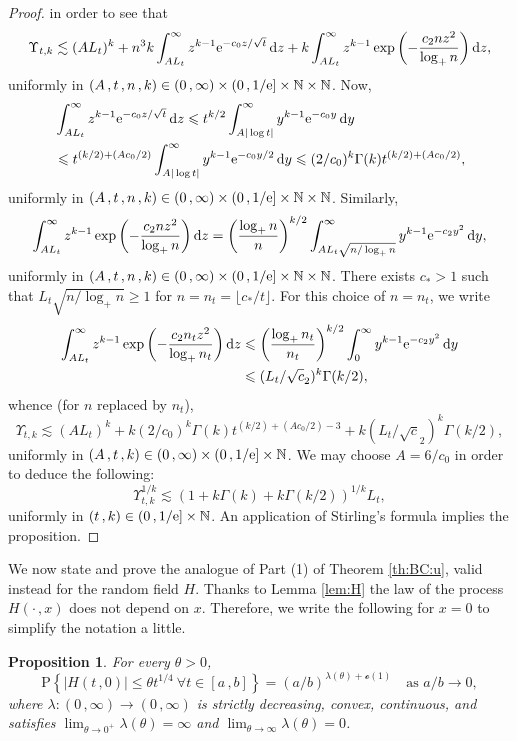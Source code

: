 \documentclass[reqno]{amsart}
\newcommand{\<}{\langle}
\renewcommand{\>}{\rangle}
\newcommand{\N}{\mathbb{N}}
\renewcommand{\P}{\mathrm{P}}
\newcommand{\1}{\mathbb{1}}
\renewcommand{\d}{{\rm d}}
\newcommand{\e}{{\rm e}}
\renewcommand{\ge}{\geqslant}
\renewcommand{\le}{\leqslant}
\newtheorem{proposition}[stat]{Proposition}
\theoremstyle{definition}
\numberwithin{equation}{section}
\begin{document}
\begin{proof}
	in order to see that
	\[
		\Upsilon_{t,k} \lesssim (AL_t)^k
		+  n^3k\int_{AL_t}^\infty z^{k-1}\e^{-c_0z/\sqrt{t}}\,\d z
		+ k\int_{AL_t}^\infty z^{k-1}
		\exp\left( - \frac{c_2nz^2}{\log_+ n}\right)\d z,
	\]
	uniformly in $(A\,,t\,,n\,,k)\in(0\,,\infty)\times(0\,,1/\e]\times\N\times\N$.
	Now,
	\begin{align*}
		&\int_{AL_t}^\infty z^{k-1}\e^{-c_0z/\sqrt{t}}\,\d z
			\le t^{k/2} \int_{A|\log t|}^\infty y^{k-1}\e^{-c_0y}\,\d y\\
		&\le t^{(k/2)+(Ac_0/2)} \int_{A|\log t|}^\infty y^{k-1}\e^{-c_0y/2}\,\d y
			\le (2/c_0)^k\Gamma(k)t^{(k/2)+(Ac_0/2)},
	\end{align*}
	uniformly in $(A\,,t\,,n\,,k)\in(0\,,\infty)\times
	(0\,,1/\e]\times\N\times\N$.
	Similarly,
	\[
		\int_{AL_t}^\infty z^{k-1}
		\exp\left( - \frac{c_2nz^2}{\log_+ n}\right)\d z
		= \left( \frac{\log_+ n}{n}\right)^{k/2}
		\int_{AL_t \sqrt{n/\log_+n}}^\infty y^{k-1} \e^{-c_2y^2}\,\d y,
	\]
	uniformly in $(A\,,t\,,n\,,k)\in(0\,,\infty)\times
	(0\,,1/\e]\times\N\times\N$. There exists $c_*>1$
	such that $L_t \sqrt{n/\log_+n} \ge 1$ for $n= n_t = \lfloor c_*/t\rfloor.$
	For this choice of $n=n_t$, we write
	\begin{align*}
		\int_{AL_t}^\infty z^{k-1}
			\exp\left( - \frac{c_2n_t z^2}{\log_+ n_t}\right)\d z
			&\le \left( \frac{\log_+ n_t}{n_t}\right)^{k/2}
			\int_0^\infty y^{k-1} \e^{-c_2y^2}\,\d y\\
		& \le (L_t/ \sqrt c_2)^{k}\Gamma(k/2),
	\end{align*}
	whence (for $n$ replaced by $n_t$),
	\[
		\Upsilon_{t,k} \lesssim (AL_t)^k
		+  k(2/c_0)^k\Gamma(k)t^{(k/2)+(Ac_0/2) -3}
		+ k(L_t/\sqrt c_2)^k\Gamma(k/2),
	\]
	uniformly in $(A\,,t\,,k)\in(0\,,\infty)\times
	(0\,,1/\e]\times\N$. We may choose
	$A=6/c_0$ in order to deduce the following:
	\[
		\Upsilon_{t,k}^{1/k}
		\lesssim \left( 1
		+  k\Gamma(k)
		+ k\Gamma(k/2)\right)^{1/k} L_t,
	\]
	uniformly in $(t\,,k)\in(0\,,1/\e]\times\N$. 
	An application of Stirling's formula
	implies the proposition.
\end{proof}

We now state and prove the analogue of Part (1) of
Theorem \ref{th:BC:u}, valid instead for the random
field $H$. Thanks to Lemma \ref{lem:H} the
law of the process $H(\cdot\,,x)$ does not depend on $x$.
Therefore, we write the following for $x=0$ to simplify the
notation a little.

\begin{proposition}\label{pr:BC:H}
	For every $\theta>0$,
	\[ 
		\P\left\{  | H(t\,,0)| \le \theta t^{1/4}\
		\forall t\in[a\,,b]\right\}
		= (a/b)^{\lambda(\theta)+\mathscr{o}(1)}\quad\text{as $a/b\to0$},
	\]
	where $\lambda:(0\,,\infty)\to(0\,,\infty)$ is strictly decreasing, convex, continuous,
	and satisfies $\lim_{\theta\to0^+}\lambda(\theta)=\infty$
	and $\lim_{\theta\to\infty}\lambda(\theta)=0$.
\end{proposition}
\end{document}
